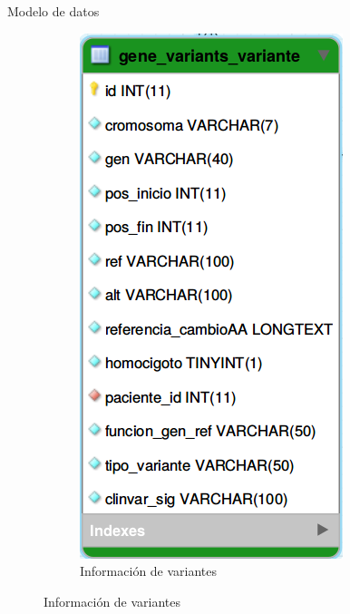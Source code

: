 \documentclass[xcolor=dvipsnames]{beamer}
\begin{document}
\begin{frame}{Modelo de datos}
\begin{figure}
\begin{subfigure}[b]{0.2\textwidth}
			\includegraphics[width=\textwidth]{tabla2.png}
			\caption{Información de variantes}
		\end{subfigure}
	\end{figure}
\end{frame}
    
\end{document}
